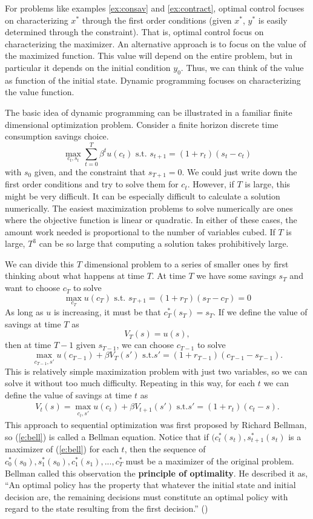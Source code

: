 For problems like examples \ref{ex:consav} and \ref{ex:contract},
optimal control focuses on characterizing $x^*$ through the first
order conditions (given $x^*$, $y^*$ is easily determined through the
constraint). That is, optimal control focus on characterizing the maximizer. An
alternative approach is to focus on the value of the maximized
function. This value will depend on the entire problem, but in
particular it depends on the initial condition $y_0$. Thus, we can
think of the value as function of the initial state. Dynamic
programming focuses on characterizing the value function.  

The basic idea of dynamic programming can be illustrated in a familiar
finite dimensional optimization problem. Consider a finite horizon
discrete time consumption savings choice. 
\[ \max_{c_t,s_t} \sum_{t=0}^T \beta^t u(c_t) \text{ s.t. } s_{t+1} =
(1+r_t) (s_t - c_t) \] with $s_0$ given, and the constraint that
$s_{T+1} = 0$. We could just write down the first order conditions and
try to solve them for $c_t$. However, if $T$ is large, this might be
very difficult. It can be especially difficult to calculate a solution
numerically. The easiest maximization problems to solve numerically
are ones where the objective function is linear or quadratic. In
either of these cases, the amount work needed is proportional to the
number of variables cubed. If $T$ is large, $T^3$ can be so large that
computing a solution takes prohibitively large. 

We can divide this $T$ dimensional problem to a
series of smaller ones by first thinking about what happens at time
$T$. At time $T$ we have some savings $s_T$ and want to choose $c_T$
to solve
\[ \max_{c_T} u(c_T) \text{ s.t. } s_{T+1} = (1+r_T)(s_T -c_T) = 0 \]
As long as $u$ is increasing, it must be that $c_T^*(s_T) = s_T$. If
we define the value of savings at time $T$ as
\[ V_T(s) = u(s), \]
then at time $T-1$ given $s_{T-1}$, we can choose $c_{T-1}$ to solve
\[ \max_{c_{T-1},s'} u(c_{T-1}) + \beta V_T(s') \text{ s.t.} s' =
  (1+r_{T-1})(c_{T-1}-s_{T-1}). \]
This is relatively simple maximization problem with just two
variables, so we can solve it without too much difficulty. Repeating
in this way, for each $t$ we can define the value of savings at time
$t$ as
\begin{align} 
  V_t(s) = \max_{c_t,s'} u(c_{t}) + \beta V_{t+1}(s') \text{ s.t.} s' =
  (1+r_{t})(c_{t}-s). \label{e:bell}
\end{align}
This approach to sequential optimization was first proposed by Richard
Bellman, so (\ref{e:bell}) is called a Bellman equation. Notice that
if $(c_t^*(s_t),s_{t+1}^*(s_t)$ is a maximizer of (\ref{e:bell}) for
each $t$, then 
the sequence of $c_0^*(s_0),s_1^*(s_0), c_1^*(s_1), ..., c_T^*$ must
be a maximizer of the original problem. Bellman called this
observation the \textbf{principle of optimality}. He described it as,
``An optimal policy has the property that whatever the initial state
and initial decision are, the remaining decisions must constitute an
optimal policy with regard to the state resulting from the first
decision.'' (\cite{bellman1962})

